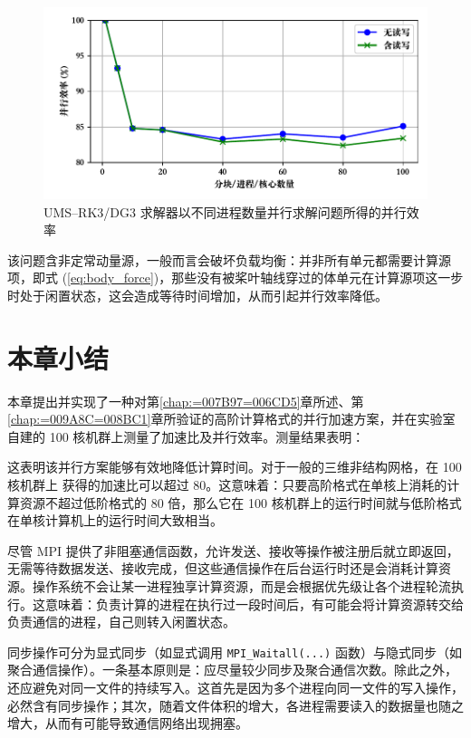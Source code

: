 \begin{figure}[h!]
\begin{centering}
\includegraphics[width=1\textwidth,height=0.3\textheight,keepaspectratio]{figures/upward/efficiency}
\par\end{centering}
\caption{\label{fig:rotor_upward_efficiency}UMS–RK3/DG3 求解器以不同进程数量并行求解问题所得的并行效率}
\end{figure}

该问题含非定常动量源，一般而言会破坏负载均衡：并非所有单元都需要计算源项，即式 (\ref{eq:body_force})，那些没有被桨叶轴线穿过的体单元在计算源项这一步时处于闲置状态，这会造成等待时间增加，从而引起并行效率降低。

\section{本章小结}

本章提出并实现了一种对第\ref{chap:=007B97=006CD5}章所述、第\ref{chap:=009A8C=008BC1}章所验证的高阶计算格式的并行加速方案，并在实验室自建的
100 核机群上测量了加速比及并行效率。测量结果表明：
\begin{description}[wide]
\item [{加速比近似随分块/进程/核心数量线性增长}] 这表明该并行方案能够有效地降低计算时间。对于一般的三维非结构网格，在 100 核机群上
获得的加速比可以超过 80。这意味着：只要高阶格式在单核上消耗的计算资源不超过低阶格式的 80 倍，那么它在 100 核机群上的运行时间就与低阶格式在单核计算机上的运行时间大致相当。
\item [{“通信与计算重叠”的假设过于理想}] 尽管 MPI 提供了非阻塞通信函数，允许发送、接收等操作被注册后就立即返回，无需等待数据发送、接收完成，但这些通信操作在后台运行时还是会消耗计算资源。操作系统不会让某一进程独享计算资源，而是会根据优先级让各个进程轮流执行。这意味着：负责计算的进程在执行过一段时间后，有可能会将计算资源转交给负责通信的进程，自己则转入闲置状态。
\item [{同步操作对并行性能有负面影响}] 同步操作可分为显式同步（如显式调用 \texttt{MPI\_Waitall(...)} 函数）与隐式同步（如聚合通信操作）。一条基本原则是：应尽量较少同步及聚合通信次数。除此之外，还应避免对同一文件的持续写入。这首先是因为多个进程向同一文件的写入操作，必然含有同步操作；其次，随着文件体积的增大，各进程需要读入的数据量也随之增大，从而有可能导致通信网络出现拥塞。
\end{description}
%


